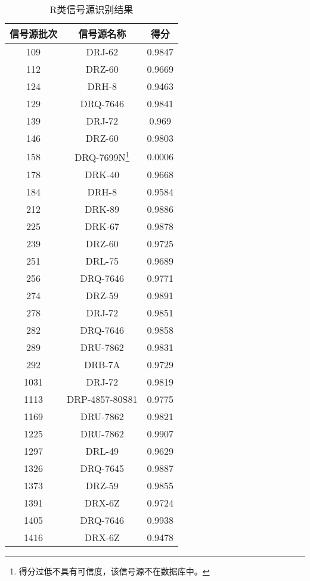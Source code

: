 \begin{table}[htbp]
	\centering
	\begin{minipage}[htbp]{7.5cm}
		\centering
		\caption{R类信号源识别结果}
		\begin{tabular}{ccc}
			\toprule
			信号源批次	&	信号源名称	&	得分			\\
			\midrule
			109  & DRJ-62         & 0.9847 \\
			112  & DRZ-60         & 0.9669 \\
			124  & DRH-8          & 0.9463 \\
			129  & DRQ-7646       & 0.9841 \\
			139  & DRJ-72         & 0.969  \\
			146  & DRZ-60         & 0.9803 \\
			158  & DRQ-7699N\footnote{得分过低不具有可信度，该信号源不在数据库中。}     & 0.0006 \\
			178  & DRK-40         & 0.9668 \\
			184  & DRH-8          & 0.9584 \\
			212  & DRK-89         & 0.9886 \\
			225  & DRK-67         & 0.9878 \\
			239  & DRZ-60         & 0.9725 \\
			251  & DRL-75         & 0.9689 \\
			256  & DRQ-7646       & 0.9771 \\
			274  & DRZ-59         & 0.9891 \\
			278  & DRJ-72         & 0.9851 \\
			282  & DRQ-7646       & 0.9858 \\
			289  & DRU-7862       & 0.9831 \\
			292  & DRB-7A         & 0.9729 \\
			1031 & DRJ-72         & 0.9819 \\
			1113 & DRP-4857-80S81 & 0.9775 \\
			1169 & DRU-7862       & 0.9821 \\
			1225 & DRU-7862       & 0.9907 \\
			1297 & DRL-49         & 0.9629 \\
			1326 & DRQ-7645       & 0.9887 \\
			1373 & DRZ-59         & 0.9855 \\
			1391 & DRX-6Z         & 0.9724 \\
			1405 & DRQ-7646       & 0.9938 \\
			1416 & DRX-6Z         & 0.9478 \\

\end{tabular}
\end{minipage}
\end{table}
